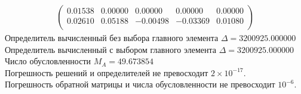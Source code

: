 \documentclass[a4paper,12pt,titlepage,finall]{article}
\begin{document}
\begin{enumerate}
\begin{align*}
\begin{pmatrix}
   0.01538&     0.00000&     0.00000&     0.00000&     0.00000 \\
   0.02610&     0.05188&    -0.00498&    -0.03369&     0.01080 \\
\end{pmatrix}
\end{align*}
Определитель вычисленный без выбора главного элемента  $\Delta = 3200925.000000$\\
Определитель вычисленный с выбором главного элемента $\Delta = 3200925.000000$\\
Число обусловленности $M_A = 49.673854$\\
Погрешность решений и определителей не превосходит $2 \times 10^{-17}$.\\
Погрешность обратной матрицы и числа обусловленности не превосходит $10^{-6}$.


\end{enumerate}
\end{document}
